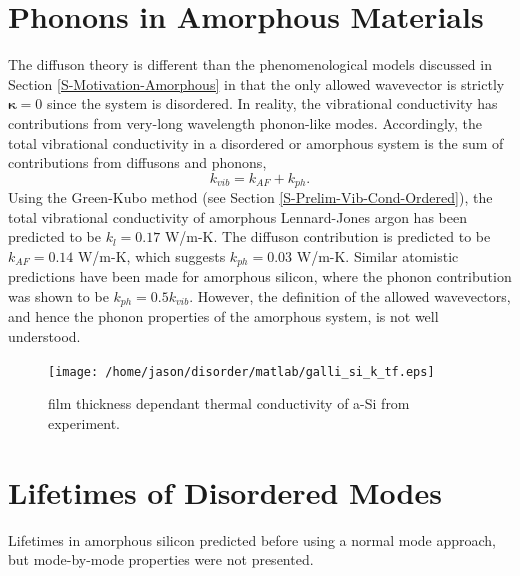 \documentclass[aps,prb,preprint,superscriptaddress,amsmath,amssymb,floatfix]{revtex4}
\begin{document}
\section{\label{S-Prelim-Phonons-Amor}Phonons in Amorphous Materials }
The diffuson theory is different than the phenomenological models 
discussed in Section \ref{S-Motivation-Amorphous} in that the only 
allowed wavevector is strictly $\mathbf{\kappa}= 0$ since the system is 
disordered. In reality, the vibrational conductivity has contributions 
from very-long wavelength phonon-like modes. Accordingly, the total 
vibrational conductivity in a disordered or amorphous system is the sum of 
contributions from diffusons and phonons,
\begin{equation}\label{EQ:M:k_thermal}
k_{vib} = k_{AF} + k_{ph}.
\end{equation}
Using the Green-Kubo method (see Section \ref{S-Prelim-Vib-Cond-Ordered}), 
the total vibrational conductivity of amorphous Lennard-Jones argon has 
been predicted to be $k_{l}=0.17$ W/m-K. The diffuson contribution is 
predicted to be $k_{AF} = 0.14$ W/m-K, which suggests 
$k_{ph} = 0.03$ W/m-K. Similar atomistic predictions have been made for 
amorphous silicon, where the phonon contribution was shown to be 
$k_{ph} = 0.5k_{vib}$.\cite{He2011a} However, the definition of the 
allowed wavevectors, and hence the phonon properties of the amorphous 
system, is not well understood.\cite{He2011a}
\begin{figure}
\begin{center}
\texttt{[image: /home/jason/disorder/matlab/galli\_si\_k\_tf.eps]}
\vspace*{-5mm}
\end{center}
\caption{\label{FIG:phonon_diff} film thickness dependant thermal 
conductivity of a-Si from experiment.}
\end{figure}

\section{\label{S:Lifetimes}Lifetimes of Disordered Modes}
Lifetimes in amorphous silicon predicted before using a normal mode 
approach, but mode-by-mode properties were not presented.
\cite{bickham_calculation_1998}
\end{document}
